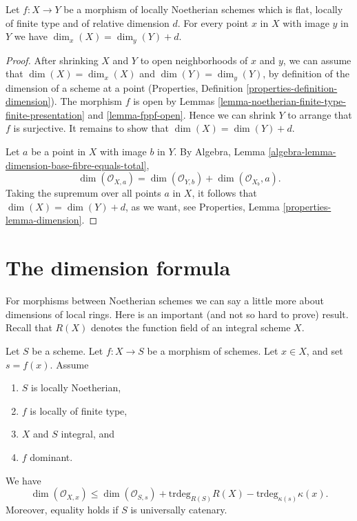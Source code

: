 \begin{lemma}
\label{lemma-rel-dimension-dimension}
Let $f : X \to Y$ be a morphism of locally Noetherian schemes
which is flat, locally of finite type and of relative dimension $d$.
For every point $x$ in $X$ with image
$y$ in $Y$ we have $\dim_x(X) = \dim_y(Y) + d$.
\end{lemma}

\begin{proof}
After shrinking $X$ and $Y$ to open neighborhoods of $x$ and $y$,
we can assume that $\dim(X) = \dim_x(X)$ and $\dim(Y) = \dim_y(Y)$,
by definition of the dimension of a scheme at a point
(Properties, Definition \ref{properties-definition-dimension}).
The morphism $f$ is open by Lemmas
\ref{lemma-noetherian-finite-type-finite-presentation} and
\ref{lemma-fppf-open}.
Hence we can shrink $Y$ to arrange that $f$ is surjective.
It remains to show that $\dim(X) = \dim(Y) + d$.

\medskip\noindent
Let $a$ be a point in $X$ with image $b$ in $Y$. By
Algebra, Lemma \ref{algebra-lemma-dimension-base-fibre-equals-total},
$$
\dim(\mathcal{O}_{X,a}) = \dim(\mathcal{O}_{Y,b}) + \dim(\mathcal{O}_{X_b},a).
$$
Taking the supremum over all points $a$ in $X$, it follows
that $\dim(X) = \dim(Y) + d$, as we want, see
Properties, Lemma \ref{properties-lemma-dimension}.
\end{proof}




\section{The dimension formula}
\label{section-dimension-formula}

\noindent
For morphisms between Noetherian schemes we can say a little more
about dimensions of local rings. Here is an important (and not so
hard to prove) result. Recall that $R(X)$ denotes the function field
of an integral scheme $X$.

\begin{lemma}
\label{lemma-dimension-formula}
Let $S$ be a scheme.
Let $f : X \to S$ be a morphism of schemes.
Let $x \in X$, and set $s = f(x)$.
Assume
\begin{enumerate}
\item $S$ is locally Noetherian,
\item $f$ is locally of finite type,
\item $X$ and $S$ integral, and
\item $f$ dominant.
\end{enumerate}
We have
\begin{equation}
\label{equation-dimension-formula}
\dim(\mathcal{O}_{X, x})
\leq
\dim(\mathcal{O}_{S, s}) + \text{trdeg}_{R(S)}R(X)
- \text{trdeg}_{\kappa(s)} \kappa(x).
\end{equation}
Moreover, equality holds if $S$ is universally catenary.
\end{lemma}

